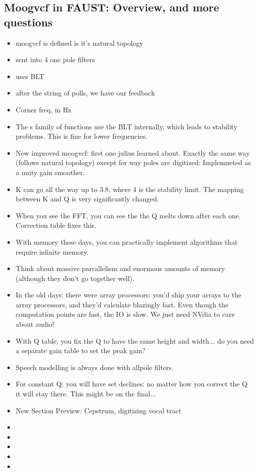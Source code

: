 \subsection*{Moogvcf in FAUST: Overview, and more questions}
\begin{itemize}
\item{
moogvcf is defined is it's natural topology
}
\item{ 
sent into 4 one pole filters
}
\item{
uses BLT
}
\item{
after the string of polls, we have our feedback
}
\item{
Corner freq, in Hz
}
\item{
The s family of functions use the BLT internally, which leads 
to stability problems. This is fine for lower frequencies. 
}
\item{
New improved moogvcf: first one julius learned about. Exactly the same way (follows natural topology)
except for way poles are digitized: Implemneted as a unity gain smoother. 
}
\item{
K can go all the way up to 3.8, where 4 is the stability limit. The mapping between K and Q is 
very significantly changed.
}
\item{
When you see the FFT, you can see the the Q melts down after each one. Correction table
fixes this. 
}
\item{
With memory these days, you can practically implement algorithms that require infinite memory. 
}
\item{
Think about massive parrallelism and enormous amounts of memory 
(although they don't go together well). 
}
\item{
In the old days: there were array processors: you'd ship your arrays to the array processors, 
and they'd calculate blazingly fast. Even though the computation points are fast, the IO is slow.
We just need NVdia to care about audio! 
}
\item{
With Q table, you fix the Q to have the same height and width... do you need a separate
gain table to set the peak gain? 
}
\item{
Speech modelling is always done with allpole filters. 
}
\item{
For constant Q: you will have set declines: no matter how you correct the Q it will stay there.
This might be on the final...
}
\item{
New Section Preview: Cepstrum, digitizing vocal tract
}
\item{

}
\item{

}
\item{}
\item{}
\item{}
\end{itemize}
